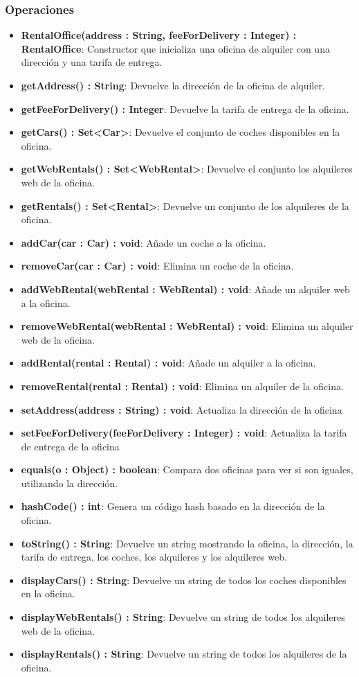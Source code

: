 \subsubsection*{Operaciones}

\begin{itemize}
    \item \textbf{RentalOffice(address : String, feeForDelivery : Integer) : RentalOffice}: 
    Constructor que inicializa una oficina de alquiler con una dirección y una tarifa de entrega.
    \item \textbf{getAddress() : String}: Devuelve la dirección de la oficina de alquiler.
    \item \textbf{getFeeForDelivery() : Integer}: Devuelve la tarifa de entrega de la oficina.
    \item \textbf{getCars() : Set<Car>}: Devuelve el conjunto de coches disponibles en la oficina.
    \item \textbf{getWebRentals() : Set<WebRental>}: Devuelve el conjunto los alquileres web de la oficina.
    \item \textbf{getRentals() : Set<Rental>}: Devuelve un conjunto de los alquileres de la oficina.
    \item \textbf{addCar(car : Car) : void}: Añade un coche a la oficina.
    \item \textbf{removeCar(car : Car) : void}: Elimina un coche de la oficina.
    \item \textbf{addWebRental(webRental : WebRental) : void}: Añade un alquiler web a la oficina.
    \item \textbf{removeWebRental(webRental : WebRental) : void}: Elimina un alquiler web de la oficina.
    \item \textbf{addRental(rental : Rental) : void}: Añade un alquiler a la oficina.
    \item \textbf{removeRental(rental : Rental) : void}: Elimina un alquiler de la oficina.
    \item \textbf{setAddress(address : String) : void}: Actualiza la dirección de la oficina
    \item \textbf{setFeeForDelivery(feeForDelivery : Integer) : void}: Actualiza la tarifa de entrega de la oficina
    \item \textbf{equals(o : Object) : boolean}: Compara dos oficinas para ver si son iguales, utilizando la dirección.
    \item \textbf{hashCode() : int}: Genera un código hash basado en la dirección de la oficina.
    \item \textbf{toString() : String}: Devuelve un string mostrando la oficina, la dirección, la tarifa de entrega, los coches, los alquileres y los alquileres web.
    \item \textbf{displayCars() : String}: Devuelve un string de todos los coches disponibles en la oficina.
    \item \textbf{displayWebRentals() : String}: Devuelve un string de todos los alquileres web de la oficina.
    \item \textbf{displayRentals() : String}: Devuelve un string de todos los alquileres de la oficina.
\end{itemize}

